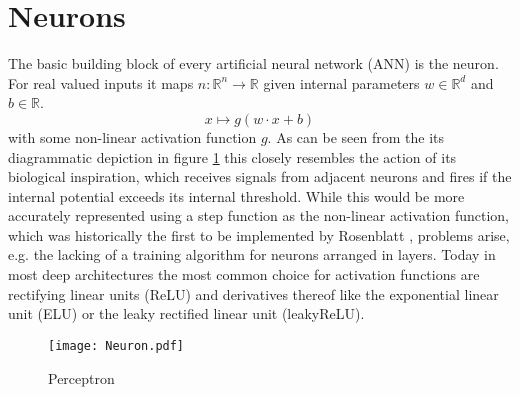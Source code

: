 \section{Neurons}
\label{sec:Neurons}
The basic building block of every artificial neural network (ANN) is the neuron. For real valued inputs it maps $n: \mathbb{R}^n \rightarrow \mathbb{R}$ given internal parameters $w \in \mathbb{R}^d$ and $b \in \mathbb{R}$.
\begin{equation}
x \mapsto g(w \cdot x + b)
\end{equation}
with some non-linear activation function $g$. As can be seen from the its diagrammatic depiction in figure \ref{fig:Neuron} this closely resembles the action of its biological inspiration, which receives signals from adjacent neurons and fires if the internal potential exceeds its internal threshold. While this would be more accurately represented using a step function as the non-linear activation function, which was historically the first to be implemented by Rosenblatt \cite{Perceptron}, problems arise, e.g. the lacking of a training algorithm for neurons arranged in layers. Today in most deep architectures the most common choice for activation functions are rectifying linear units (ReLU) and derivatives thereof like the exponential linear unit (ELU) or the leaky rectified linear unit (leakyReLU).
\begin{figure}
\centering
  \texttt{[image: Neuron.pdf]}
  \caption{Perceptron}
  \label{fig:Neuron}
\end{figure}

